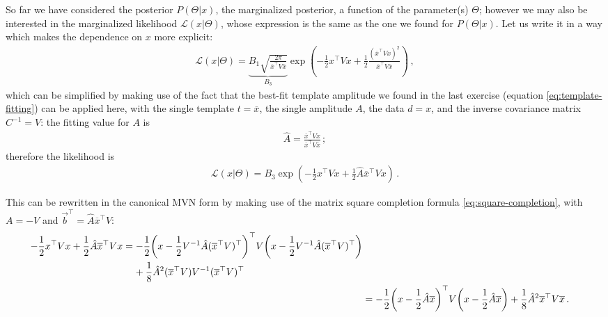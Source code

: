 \documentclass[main.tex]{subfiles}
\begin{document}
So far we have considered the posterior \(P(\Theta | x)\), the marginalized posterior, a function of the parameter(s) \(\Theta \); however we may also be interested in the marginalized likelihood \(\mathscr{L}(x | \Theta )\), whose expression is the same as the one we found for \(P(\Theta | x)\).
Let us write it in a way which makes the dependence on \(x\) more explicit: 
%
\begin{align} \label{eq:marginalized-likelihood}
\mathscr{L}(x | \Theta ) = \underbrace{B_1 \sqrt{\frac{2 \pi }{\overline{x}^{\top} V \overline{x}}}}_{B_3 } \exp(- \frac{1}{2} x^{\top} V x + 
\frac{1}{2}
\frac{(\overline{x}^{\top} V x)^2}{\overline{x}^{\top} V \overline{x}})
\,,
\end{align}
%
which can be simplified by making use of the fact that the best-fit template amplitude we found in the last exercise (equation \eqref{eq:template-fitting}) can be applied here, with the single template \(t = \overline{x}\), the single amplitude \(A\), the data \(d = x\), and the inverse covariance matrix \(C^{-1}= V\): the fitting value for \(A \) is 
%
\begin{align}
\hat{A} = \frac{\overline{x}^{\top} V x}{\overline{x}^{\top} V \overline{x}}
\,;
\end{align}
%
therefore the likelihood is 
%
\begin{align}
\mathscr{L}(x | \Theta ) = B_3 \exp(- \frac{1}{2} x^{\top} V x +
\frac{1}{2}
 \hat{A} \overline{x}^{\top} V x)
\,.
\end{align}

This can be rewritten in the canonical MVN form by making use of the matrix square completion formula \eqref{eq:square-completion}, with \(A = -V\) and \(\vec{b}^{\top} = \hat{A} \overline{x}^{\top} V\): 
%
\begin{align}
\begin{split}
- \frac{1}{2} x^{\top} V x + \frac{1}{2} \hat{A} \overline{x}^{\top} V x
&= - \frac{1}{2} 
\qty(x - \frac{1}{2} V^{-1} \hat{A} (\overline{x}^{\top} V)^{\top})^{\top} V
\qty(x - \frac{1}{2} V^{-1} \hat{A} (\overline{x}^{\top} V)^{\top}) \\
&\phantom{=}\ 
+ \frac{1}{8} \hat{A}^2 (\overline{x}^{\top} V) V^{-1} (\overline{x}^{\top} V)^{\top}  
\end{split}\\
&= - \frac{1}{2} 
\qty(x - \frac{1}{2} \hat{A} \overline{x})^{\top}
V 
\qty(x - \frac{1}{2} \hat{A} \overline{x})
+ 
\frac{1}{8} \hat{A}^2 \overline{x}^{\top} V \overline{x}
\,.
\end{align}
\end{document}
